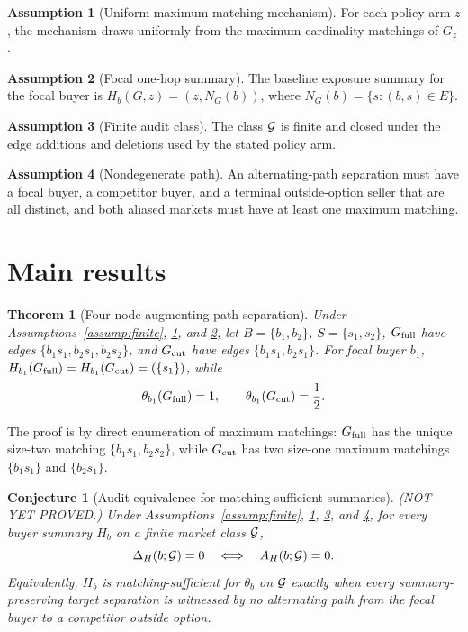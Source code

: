 \documentclass[11pt]{article}
\theoremstyle{definition}
\newtheorem{assumption}{Assumption}
\theoremstyle{plain}
\newtheorem{theorem}{Theorem}
\newtheorem{conjecture}{Conjecture}
\theoremstyle{remark}
\begin{document}
\begin{assumption}[Uniform maximum-matching mechanism]\label{assump:uniform}
For each policy arm \(z\), the mechanism draws uniformly from the maximum-cardinality matchings of \(G_z\).
\end{assumption}

\begin{assumption}[Focal one-hop summary]\label{assump:summary}
The baseline exposure summary for the focal buyer is \(H_b(G,z)=(z,N_G(b))\), where \(N_G(b)=\{s:(b,s)\in E\}\).
\end{assumption}

\begin{assumption}[Finite audit class]\label{assump:auditclass}
The class \({\cal G}\) is finite and closed under the edge additions and deletions used by the stated policy arm.
\end{assumption}

\begin{assumption}[Nondegenerate path]\label{assump:nondegenerate}
An alternating-path separation must have a focal buyer, a competitor buyer, and a terminal outside-option seller that are all distinct, and both aliased markets must have at least one maximum matching.
\end{assumption}

\section{Main results}
\begin{theorem}[Four-node augmenting-path separation]\label{thm:four-node}
Under Assumptions~\ref{assump:finite}, \ref{assump:uniform}, and \ref{assump:summary}, let \(B=\{b_1,b_2\}\), \(S=\{s_1,s_2\}\), \(G_{\rm full}\) have edges \(\{b_1s_1,b_2s_1,b_2s_2\}\), and \(G_{\rm cut}\) have edges \(\{b_1s_1,b_2s_1\}\).  For focal buyer \(b_1\), \(H_{b_1}(G_{\rm full})=H_{b_1}(G_{\rm cut})=(\{s_1\})\), while
\[
\theta_{b_1}(G_{\rm full})=1,\qquad \theta_{b_1}(G_{\rm cut})=\frac12.
\]
\end{theorem}
The proof is by direct enumeration of maximum matchings: \(G_{\rm full}\) has the unique size-two matching \(\{b_1s_1,b_2s_2\}\), while \(G_{\rm cut}\) has two size-one maximum matchings \(\{b_1s_1\}\) and \(\{b_2s_1\}\).

\begin{conjecture}[Audit equivalence for matching-sufficient summaries]\label{conj:audit}
(NOT YET PROVED.) Under Assumptions~\ref{assump:finite}, \ref{assump:uniform}, \ref{assump:auditclass}, and \ref{assump:nondegenerate}, for every buyer summary \(H_b\) on a finite market class \({\cal G}\),
\[
\Delta_H(b;{\cal G})=0
\quad\Longleftrightarrow\quad
A_H(b;{\cal G})=0.
\]
Equivalently, \(H_b\) is matching-sufficient for \(\theta_b\) on \({\cal G}\) exactly when every summary-preserving target separation is witnessed by no alternating path from the focal buyer to a competitor outside option.
\end{conjecture}
\end{document}
